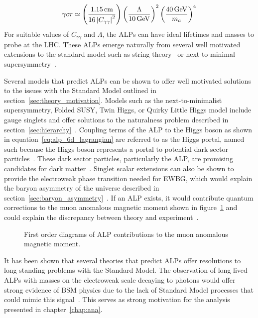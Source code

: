\begin{equation}
	\gamma c\tau\simeq\left(\frac{1.15\unit{cm}}{16\left|C_{\gamma\gamma}\right|^2}\right)\left(\frac{\Lambda}{10\GeV}\right)^2\left(\frac{40\GeV}{m_a}\right)^4
\end{equation}
For suitable values of $C_{\gamma\gamma}$ and $\Lambda$, the ALPs can have ideal lifetimes and masses to probe at the LHC. These ALPs emerge naturally from several well motivated extensions to the standard model such as string theory~\cite{axion_st1,axion_st2,axion_st3} or next-to-minimal supersymmetry~\cite{axion_ss1,axion_ss2}.

Several models that predict ALPs can be shown to offer well motivated solutions to the issues with the Standard Model outlined in section~\ref{sec:theory_motivation}. Models such as the next-to-minimalist supersymmetry, Folded SUSY, Twin Higgs, or Quirky Little Higgs model include gauge singlets and offer solutions to the naturalness problem described in section~\ref{sec:hierarchy}~\cite{hierarchy,hierarchy2}. Coupling terms of the ALP to the Higgs boson as shown in equation~\ref{eq:alp_6d_lagrangian} are referred to as the Higgs portal, named such because the Higgs boson represents a portal to potential dark sector particles~\cite{Curtin_2014}. These dark sector particles, particularly the ALP, are promising candidates for dark matter~\cite{alp_dm1,alp_dm2,alp_dm3,alp_dm4,alp_dm5,alp_dm6}. Singlet scalar extensions can also be shown to provide the electroweak phase transition needed for EWBG, which would explain the baryon asymmetry of the universe described in section~\ref{sec:baryon_asymmetry}~\cite{alp_ewbg1,alp_ewbg2}. If an ALP exists, it would contribute quantum corrections to the muon anomalous magnetic moment shown in figure~\ref{fig:muon_magnetic_moment_alp} and could explain the discrepancy between theory and experiment~\cite{alp_colliders}.
\begin{figure}[htb!]
	\centering
	\begingroup
	
	
	\endgroup
	\caption[First order diagrams of ALP contributions to the muon anomalous magnetic moment.]{First order diagrams of ALP contributions to the muon anomalous magnetic moment.}
	\label{fig:muon_magnetic_moment_alp}
\end{figure}

It has been shown that several theories that predict ALPs offer resolutions to long standing problems with the Standard Model. The observation of long lived ALPs with masses on the electroweak scale decaying to photons would offer strong evidence of BSM physics due to the lack of Standard Model processes that could mimic this signal~\cite{Curtin_2014}. This serves as strong motivation for the analysis presented in chapter~\ref{chap:ana}.